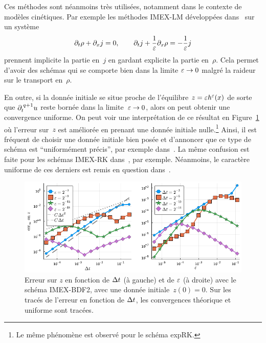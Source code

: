Ces méthodes sont néanmoins très utilisées, notamment dans le contexte de modèles cinétiques. Par exemple les méthodes IMEX-LM développées dans~\cite{lemou.2008.new,boscarino.2017.unified,albi.2020.implicit} sur un système 
\begin{equation*}
    \partial_t \rho + \partial_x j = 0, \qquad 
    \partial_t j + \frac{1}{\varepsilon} \partial_x \rho = -\frac{1}{\varepsilon}j 
\end{equation*}
prennent implicite la partie en~$j$ en gardant explicite la partie en~$\rho$. Cela permet d'avoir des schémas qui se comporte bien dans la limite $\varepsilon \rightarrow 0$ malgré la raideur sur le transport en~$\rho$. 

En outre, si la donnée initiale se situe proche de l'équilibre $z = \varepsilon h^{\varepsilon}(x)$ de sorte que $\partial_t^{\: q+1} u$ reste bornée dans la limite~$\varepsilon \rightarrow 0$, alors on peut obtenir une convergence uniforme. On peut voir une interprétation de ce résultat en Figure~\ref{sec:intro:fig:bdf2_z0} où l'erreur sur~$z$ est améliorée en prenant une donnée initiale nulle.\footnote{Le même phénomène est observé pour le schéma expRK.} Ainsi, il est fréquent de choisir une donnée initiale bien posée et d'annoncer que ce type de schéma est \enquote{uniformément précis}, par exemple dans~\cite{jin.2000.uniformly,hu.2021.uniform}. La même confusion est faite pour les schémas IMEX-RK dans~\cite{boscarino.2009.class,boscarino.2017.unified}, par exemple. Néanmoins, le caractère uniforme de ces derniers est remis en question dans~\cite{hu.2021.uniform}.

\begin{figure}
    \centering
    \includegraphics[width=\textwidth]{./Presentation/bdf2_err_z0.pdf}
    \caption{Erreur sur $z$ en fonction de $\Delta t$ (à gauche) et de $\varepsilon$ (à droite) avec le schéma IMEX-BDF2, avec une donnée initiale~$z(0) = 0$. Sur les tracés de l'erreur en fonction de $\Delta t$, les convergences théorique et uniforme sont tracées.}
    \label{sec:intro:fig:bdf2_z0}
\end{figure}



